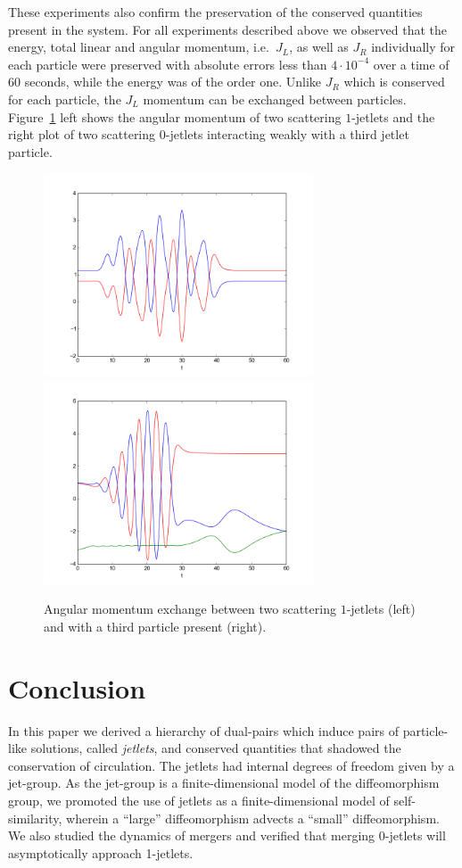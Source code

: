 \documentclass[12pt]{amsart}
\begin{document}
These experiments also confirm the preservation of the conserved
quantities present in the system. For all experiments described above
we observed that the energy, total linear and angular momentum,
i.e.~$J_L$, as well as $J_R$ individually for each particle were
preserved with absolute errors less than $4 \cdot 10^{-4}$ over a time
of $60$ seconds, while the energy was of the order one. Unlike $J_R$
which is conserved for each particle, the $J_L$ momentum can be
exchanged between particles. Figure~\ref{fig:angmom-exchange} left shows
the angular momentum of two scattering $1$-jetlets and
the right plot of two scattering $0$-jetlets
interacting weakly with a third jetlet particle.

\begin{figure}[htb]
  \centering
  \includegraphics[width=8cm]{angmom-1jetlets}
  \includegraphics[width=8cm]{angmom-3rd-jetlet}
  \caption{Angular momentum exchange between two scattering
    $1$-jetlets (left) and with a third particle present (right).}
  \label{fig:angmom-exchange}
\end{figure}

\section{Conclusion}
  In this paper we derived a hierarchy of dual-pairs
  which induce pairs of particle-like solutions, called \emph{jetlets}, and conserved quantities
  that shadowed the conservation of circulation.
  The jetlets had internal degrees of freedom given by a jet-group.
  As the jet-group is a finite-dimensional model of the diffeomorphism
  group, we promoted the use of jetlets as a finite-dimensional model
  of self-similarity, wherein a ``large'' diffeomorphism advects a ``small''
  diffeomorphism.
  We also studied the dynamics of mergers and verified that merging
  0-jetlets will asymptotically approach 1-jetlets.
\end{document}
